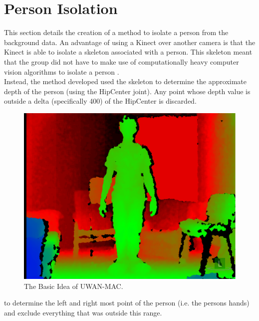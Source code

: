\section{Person Isolation}
\label{person isolation}
This section details the creation of a method to isolate a person from the background data. An advantage of using a Kinect over another camera is that the Kinect is able to isolate a skeleton associated with a person. This skeleton meant that the group did not have to make use of computationally heavy computer vision algorithms to isolate a person .\\

Instead, the method developed used the skeleton to determine the approximate depth of the person (using the HipCenter joint). Any point whose depth value is outside a delta (specifically 400) of the HipCenter is discarded.

\begin{figure}[h]
\begin{center}
\includegraphics[scale=0.75]{./design/parse1}
\end{center}
\caption{The Basic Idea of UWAN-MAC.}
\label{fig:basicidea}
\end{figure} 

to determine the left and right most point of the person (i.e. the persons hands) and exclude everything that was outside this range.